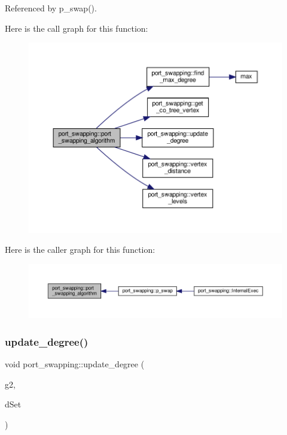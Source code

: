 Referenced by p\+\_\+swap().

Here is the call graph for this function\+:
\nopagebreak
\begin{figure}[H]
\begin{center}
\leavevmode
\includegraphics[width=350pt]{d6/d83/classport__swapping_a0abef9594eed32fbbc61a0f798265145_cgraph}
\end{center}
\end{figure}
Here is the caller graph for this function\+:
\nopagebreak
\begin{figure}[H]
\begin{center}
\leavevmode
\includegraphics[width=350pt]{d6/d83/classport__swapping_a0abef9594eed32fbbc61a0f798265145_icgraph}
\end{center}
\end{figure}
\mbox{\label{classport__swapping_a7c205c3674a0352aa59355348a571579}} 
\subsubsection{\texorpdfstring{update\+\_\+degree()}{update\_degree()}}
{\footnotesize\ttfamily void port\+\_\+swapping\+::update\+\_\+degree (\begin{DoxyParamCaption}\item[{\hyperlink{classport__swapping_a77c6a219f0b86bd9340d8354e3fff755}{P\+S\+Graph}}]{g2,  }\item[{\hyperlink{classCustomOrderedSet}{Custom\+Ordered\+Set}$<$ std\+::pair$<$ \hyperlink{classport__swapping_a9588366dd46f9f32aab2c8de93d5679f}{P\+S\+Vertex}, unsigned int $>$$>$ \&}]{d\+Set }\end{DoxyParamCaption})}



